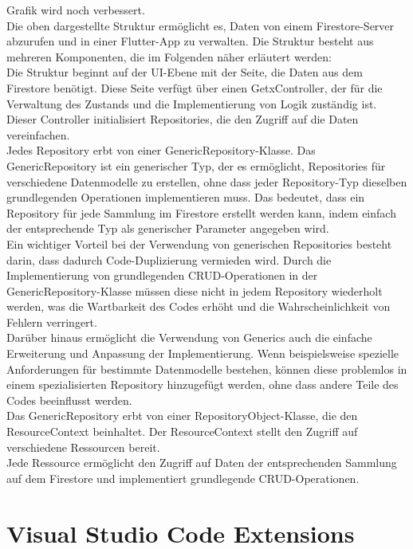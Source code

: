 Grafik wird noch verbessert.
\\
Die oben dargestellte Struktur ermöglicht es, Daten von einem Firestore-Server abzurufen und in einer Flutter-App zu verwalten. Die Struktur besteht aus mehreren Komponenten, die im Folgenden näher erläutert werden:
\\
Die Struktur beginnt auf der UI-Ebene mit der Seite, die Daten aus dem Firestore benötigt. Diese Seite verfügt über einen GetxController, der für die Verwaltung des Zustands und die Implementierung von Logik zuständig ist. Dieser Controller initialisiert Repositories, die den Zugriff auf die Daten vereinfachen.
\\
Jedes Repository erbt von einer GenericRepository-Klasse. Das GenericRepository ist ein generischer Typ, der es ermöglicht, Repositories für verschiedene Datenmodelle zu erstellen, ohne dass jeder Repository-Typ dieselben grundlegenden Operationen implementieren muss. Das bedeutet, dass ein Repository für jede Sammlung im Firestore erstellt werden kann, indem einfach der entsprechende Typ als generischer Parameter angegeben wird.
\\
Ein wichtiger Vorteil bei der Verwendung von generischen Repositories besteht darin, dass dadurch Code-Duplizierung vermieden wird. Durch die Implementierung von grundlegenden CRUD-Operationen in der GenericRepository-Klasse müssen diese nicht in jedem Repository wiederholt werden, was die Wartbarkeit des Codes erhöht und die Wahrscheinlichkeit von Fehlern verringert.
\\
Darüber hinaus ermöglicht die Verwendung von Generics auch die einfache Erweiterung und Anpassung der Implementierung. Wenn beispielsweise spezielle Anforderungen für bestimmte Datenmodelle bestehen, können diese problemlos in einem spezialisierten Repository hinzugefügt werden, ohne dass andere Teile des Codes beeinflusst werden.
\\
Das GenericRepository erbt von einer RepositoryObject-Klasse, die den ResourceContext beinhaltet. Der ResourceContext stellt den Zugriff auf verschiedene Ressourcen bereit.
\\
Jede Ressource ermöglicht den Zugriff auf Daten der entsprechenden Sammlung auf dem Firestore und implementiert grundlegende CRUD-Operationen.


\section{Visual Studio Code Extensions}




